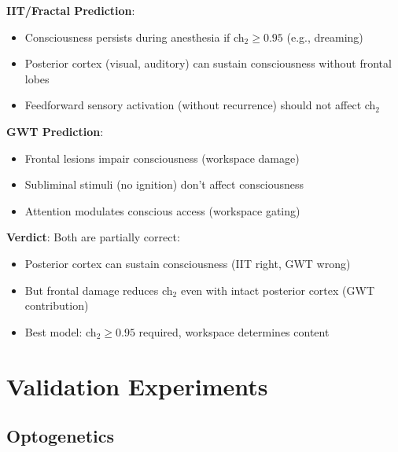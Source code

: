 \begin{comparison}
\textbf{IIT/Fractal Prediction}:
\begin{itemize}
\item Consciousness persists during anesthesia if ch$_2 \geq 0.95$ (e.g., dreaming)
\item Posterior cortex (visual, auditory) can sustain consciousness without frontal lobes
\item Feedforward sensory activation (without recurrence) should not affect ch$_2$
\end{itemize}

\textbf{GWT Prediction}:
\begin{itemize}
\item Frontal lesions impair consciousness (workspace damage)
\item Subliminal stimuli (no ignition) don't affect consciousness
\item Attention modulates conscious access (workspace gating)
\end{itemize}

\textbf{Verdict}: Both are partially correct:
\begin{itemize}
\item Posterior cortex can sustain consciousness (IIT right, GWT wrong)\cite{boly2017}
\item But frontal damage reduces ch$_2$ even with intact posterior cortex (GWT contribution)
\item Best model: ch$_2 \geq 0.95$ required, workspace determines content
\end{itemize}
\end{comparison}

\section{Validation Experiments}

\subsection{Optogenetics}

